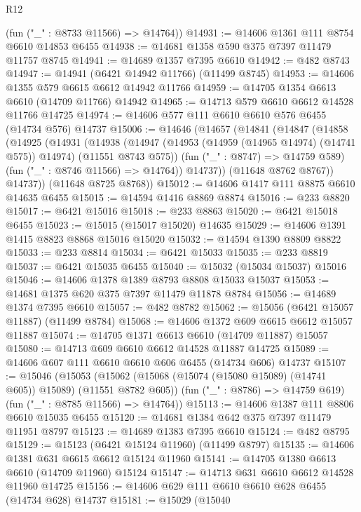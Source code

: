 \begin{lexlean}{R12}
\begin{coremodule}
      (fun ("_" : @8733 @11566) => @14764))
@14931 := @14606 @1361 @111 @8754 @6610 @14853 @6455
@14938 := @14681 @1358 @590 @375 @7397 @11479 @11757 @8745
@14941 := @14689 @1357 @7395 @6610
@14942 := @482 @8743
@14947 := @14941 (@6421 @14942 @11766) (@11499 @8745)
@14953 := @14606 @1355 @579 @6615 @6612 @14942 @11766
@14959 := @14705 @1354 @6613 @6610 (@14709 @11766) @14942
@14965 := @14713 @579 @6610 @6612 @14528 @11766 @14725
@14974 := @14606 @577 @111 @6610 @6610 @576 @6455 (@14734 @576) @14737
@15006 := @14646
    (@14657
      (@14841
        (@14847
          (@14858
            (@14925
              (@14931
                (@14938
                  (@14947
                    (@14953 (@14959 (@14965 @14974) (@14741 @575)) @14974)
                    (@11551 @8743 @575))
                  (fun ("_" : @8747) => @14759 @589)
                  (fun ("_" : @8746 @11566) => @14764))
                @14737))
            (@11648 @8762 @8767))
          @14737))
      (@11648 @8725 @8768))
@15012 := @14606 @1417 @111 @8875 @6610 @14635 @6455
@15015 := @14594 @1416 @8869 @8874
@15016 := @233 @8820
@15017 := @6421 @15016
@15018 := @233 @8863
@15020 := @6421 @15018 @6455
@15023 := @15015 (@15017 @15020) @14635
@15029 := @14606 @1391 @1415 @8823 @8868 @15016 @15020
@15032 := @14594 @1390 @8809 @8822
@15033 := @233 @8814
@15034 := @6421 @15033
@15035 := @233 @8819
@15037 := @6421 @15035 @6455
@15040 := @15032 (@15034 @15037) @15016
@15046 := @14606 @1378 @1389 @8793 @8808 @15033 @15037
@15053 := @14681 @1375 @620 @375 @7397 @11479 @11878 @8784
@15056 := @14689 @1374 @7395 @6610
@15057 := @482 @8782
@15062 := @15056 (@6421 @15057 @11887) (@11499 @8784)
@15068 := @14606 @1372 @609 @6615 @6612 @15057 @11887
@15074 := @14705 @1371 @6613 @6610 (@14709 @11887) @15057
@15080 := @14713 @609 @6610 @6612 @14528 @11887 @14725
@15089 := @14606 @607 @111 @6610 @6610 @606 @6455 (@14734 @606) @14737
@15107 := @15046
    (@15053
      (@15062 (@15068 (@15074 (@15080 @15089) (@14741 @605)) @15089) (@11551 @8782 @605))
      (fun ("_" : @8786) => @14759 @619)
      (fun ("_" : @8785 @11566) => @14764))
@15113 := @14606 @1387 @111 @8806 @6610 @15035 @6455
@15120 := @14681 @1384 @642 @375 @7397 @11479 @11951 @8797
@15123 := @14689 @1383 @7395 @6610
@15124 := @482 @8795
@15129 := @15123 (@6421 @15124 @11960) (@11499 @8797)
@15135 := @14606 @1381 @631 @6615 @6612 @15124 @11960
@15141 := @14705 @1380 @6613 @6610 (@14709 @11960) @15124
@15147 := @14713 @631 @6610 @6612 @14528 @11960 @14725
@15156 := @14606 @629 @111 @6610 @6610 @628 @6455 (@14734 @628) @14737
@15181 := @15029
    (@15040

\end{coremodule}
\end{lexlean}

